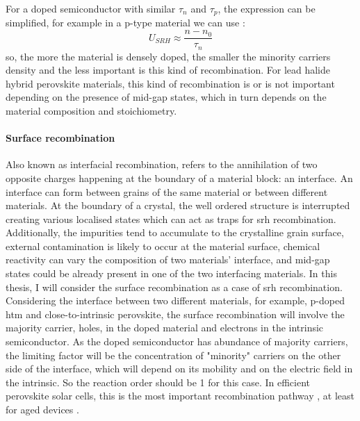 		For a doped semiconductor with similar $\tau_n$ and $\tau_p$, the expression can be simplified, for example in a p-type material we can use \cite[108]{Nelson2003}:
		\begin{equation}
		U_{SRH} \approx \frac{n-n_0}{\tau_n}
		\end{equation}
		so, the more the material is densely doped, the smaller the minority carriers density and the less important is this kind of recombination.
		For lead halide hybrid perovskite materials, this kind of recombination is or is not important depending on the presence of mid-gap states, which in turn depends on the material composition and stoichiometry.

		\paragraph{Surface recombination}\label{intro_surface_recombination}
		Also known as interfacial recombination, refers to the annihilation of two opposite charges happening at the boundary of a material block: an interface.
		An interface can form between grains of the same material or between different materials.
		At the boundary of a crystal, the well ordered structure is interrupted creating various localised states which can act as traps for \gls{srh} recombination.
		Additionally, the impurities tend to accumulate to the crystalline grain surface, external contamination is likely to occur at the material surface, chemical reactivity can vary the composition of two materials' interface, and mid-gap states could be already present in one of the two interfacing materials.
		In this thesis, I will consider the surface recombination as a case of \gls{srh} recombination.
		Considering the interface between two different materials, for example, p-doped \gls{htm} and close-to-intrinsic perovskite, the surface recombination will involve the majority carrier, holes, in the doped material and electrons in the intrinsic semiconductor.
		As the doped semiconductor has abundance of majority carriers, the limiting factor will be the concentration of "minority" carriers on the other side of the interface, which will depend on its mobility and on the electric field in the intrinsic.
		So the reaction order should be 1 for this case.
		In efficient perovskite solar cells, this is the most important recombination pathway \cite{Calado2019,Carnie2015,Stolterfoht2018a}, at least for aged devices \cite{Tress2018,Correa-Baena2017a}.

